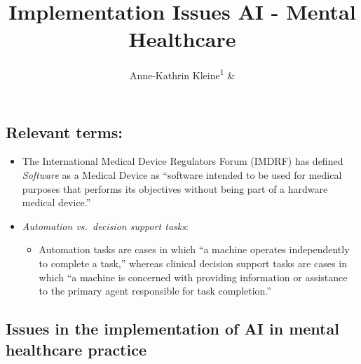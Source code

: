 \documentclass[
  man]{apa7}
\title{Implementation Issues AI - Mental Healthcare}
\author{Anne-Kathrin Kleine\textsuperscript{1} \& \textsuperscript{}}
\date{}
\providecommand{\tightlist}{%
  \setlength{\itemsep}{0pt}\setlength{\parskip}{0pt}}
\begin{document}
\maketitle

\hypertarget{relevant-terms}{%
\subsection{Relevant terms:}\label{relevant-terms}}

\begin{itemize}
\tightlist
\item
  The International Medical Device Regulators Forum (IMDRF) has defined \emph{Software} as a Medical Device as ``software intended to be used for medical purposes that performs its objectives without being part of a hardware medical device.''
\item
  \emph{Automation vs.~decision support tasks}:

  \begin{itemize}
  \tightlist
  \item
    Automation tasks are cases in which ``a machine operates independently to complete a task,'' whereas clinical decision support tasks are cases in which ``a machine is concerned with providing information or assistance to the primary agent responsible for task completion.''
  \end{itemize}
\end{itemize}

\hypertarget{issues-in-the-implementation-of-ai-in-mental-healthcare-practice}{%
\subsection{Issues in the implementation of AI in mental healthcare practice}\label{issues-in-the-implementation-of-ai-in-mental-healthcare-practice}}
\end{document}
